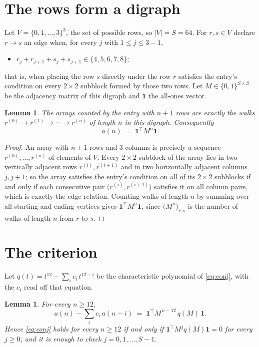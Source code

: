 \documentclass[11pt,a4paper]{article}
\theoremstyle{plain}
\newtheorem{lemma}[theorem]{Lemma}
\theoremstyle{definition}
\begin{document}
\section{The rows form a digraph}

Let $V=\{0,1,\dots,3\}^{3}$, the set of possible rows, so $|V|=S=64$. For
$r,s\in V$ declare $r\to s$ an edge when, for every $j$ with $1\le j\le 3-1$,
\begin{itemize}
\item $r_j+r_{j+1}+s_j+s_{j+1}\in\{4, 5, 6, 7, 8\}$;

\end{itemize}
that is, when placing the row $s$ directly under the row $r$ satisfies the entry's
condition on every $2\times2$ subblock formed by those two rows. Let $M\in\{0,1\}^{S\times
S}$ be the adjacency matrix of this digraph and $\mathbf{1}$ the all-ones vector.

\begin{lemma}\label{lem:walk}
The arrays counted by the entry with $n+1$ rows are exactly the walks
$r^{(0)}\to r^{(1)}\to\cdots\to r^{(n)}$ of length $n$ in this digraph. Consequently
\[
a(n)\;=\;\mathbf{1}^{\!\top}M^{n}\mathbf{1} .
\]
\end{lemma}

\begin{proof}
An array with $n+1$ rows and $3$ columns is precisely a sequence
$r^{(0)},\dots,r^{(n)}$ of elements of $V$. Every $2\times2$ subblock of the array lies
in two vertically adjacent rows $r^{(i)},r^{(i+1)}$ and in two horizontally adjacent
columns $j,j+1$; so the array satisfies the entry's condition on all of its $2\times2$
subblocks if and only if each consecutive pair $\bigl(r^{(i)},r^{(i+1)}\bigr)$ satisfies
it on all column pairs, which is exactly the edge relation. Counting walks of length $n$ by
summing over all starting and ending vertices gives
$\mathbf{1}^{\!\top}M^{n}\mathbf{1}$, since
$\bigl(M^{n}\bigr)_{r,s}$ is the number of walks of length $n$ from $r$ to $s$.
\end{proof}

\section{The criterion}

Let $q(t)=t^{12}-\sum_{i}c_i\,t^{12-i}$ be the characteristic polynomial of
\eqref{eq:conj}, with the $c_i$ read off that equation.

\begin{lemma}\label{lem:crit}
For every $n\ge12$,
\[
a(n)-\sum_i c_i\,a(n-i)\;=\;\mathbf{1}^{\!\top}M^{\,n-12}\,q(M)\,\mathbf{1} .
\]
Hence \eqref{eq:conj} holds for every $n\ge12$ if and only if
$\mathbf{1}^{\!\top}M^{j}q(M)\mathbf{1}=0$ for every $j\ge0$; and it is enough to
check $j=0,1,\dots,S-1$.
\end{lemma}
\end{document}
